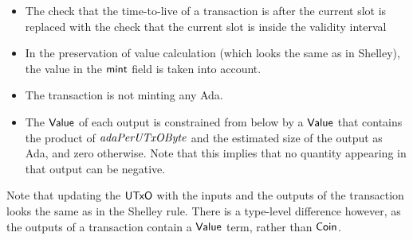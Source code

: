 \begin{itemize}
  \item The check that the time-to-live of a transaction is after the current
  slot is replaced with the check that the current slot is inside the validity interval

  \item In the preservation of value calculation (which looks the same as in
  Shelley), the value in the $\mathsf{mint}$ field is taken into account.

  \item The transaction is not minting any Ada.

  \item The $\mathsf{Value}$ of each output is constrained from below by a
    $\mathsf{Value}$ that contains the product of $\mathit{adaPerUTxOByte}$ and the
    estimated size of the output as Ada, and zero otherwise. Note that
    this implies that no quantity appearing in that output can be
    negative.
\end{itemize}

Note that updating the $\mathsf{UTxO}$ with the inputs and the outputs of the transaction
looks the same as in the Shelley rule. There is a type-level difference however, as
the outputs of a transaction contain a $\mathsf{Value}$ term, rather than
$\mathsf{Coin}$.


